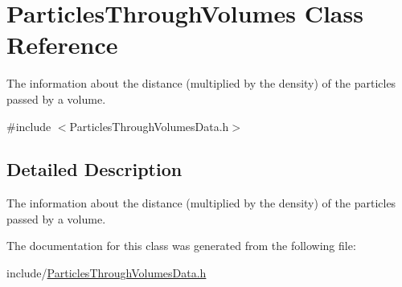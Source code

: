 \hypertarget{class_particles_through_volumes}{\section{Particles\-Through\-Volumes Class Reference}
\label{class_particles_through_volumes}
}


The information about the distance (multiplied by the density) of the particles passed by a volume.  




{\ttfamily \#include $<$Particles\-Through\-Volumes\-Data.\-h$>$}



\subsection{Detailed Description}
The information about the distance (multiplied by the density) of the particles passed by a volume. 

The documentation for this class was generated from the following file\-:\begin{DoxyCompactItemize}
\item 
include/\hyperlink{_particles_through_volumes_data_8h}{Particles\-Through\-Volumes\-Data.\-h}\end{DoxyCompactItemize}
